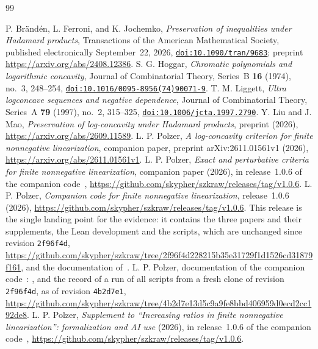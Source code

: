 \begin{thebibliography}{99}

 P. Br\"and\'en, L. Ferroni, and K. Jochemko, \emph{Preservation of inequalities under Hadamard products}, Transactions of the American Mathematical Society, published electronically September~22, 2026, \href{https://doi.org/10.1090/tran/9683}{\nolinkurl{doi:10.1090/tran/9683}}; preprint \url{https://arxiv.org/abs/2408.12386}.
 S. G. Hoggar, \emph{Chromatic polynomials and logarithmic concavity}, Journal of Combinatorial Theory, Series~B \textbf{16} (1974), no.~3, 248--254, \href{https://doi.org/10.1016/0095-8956(74)90071-9}{\nolinkurl{doi:10.1016/0095-8956(74)90071-9}}.
 T. M. Liggett, \emph{Ultra logconcave sequences and negative dependence}, Journal of Combinatorial Theory, Series~A \textbf{79} (1997), no.~2, 315--325, \href{https://doi.org/10.1006/jcta.1997.2790}{\nolinkurl{doi:10.1006/jcta.1997.2790}}.
 Y. Liu and J. Mao, \emph{Preservation of log-concavity under Hadamard products}, preprint (2026), \url{https://arxiv.org/abs/2609.11589}.
 L. P. Polzer, \emph{A log-concavity criterion for finite nonnegative linearization}, companion paper, preprint arXiv:2611.01561v1 (2026), \url{https://arxiv.org/abs/2611.01561v1}.
 L. P. Polzer, \emph{Exact and perturbative criteria for finite nonnegative linearization}, companion paper (2026), in release~1.0.6 of the companion code~\cite{code}, \url{https://github.com/skypher/szkraw/releases/tag/v1.0.6}.
 L. P. Polzer, \emph{Companion code for finite nonnegative linearization}, release~1.0.6 (2026), \url{https://github.com/skypher/szkraw/releases/tag/v1.0.6}. This release is the single landing point for the evidence: it contains the three papers and their supplements, the Lean development and the scripts, which are unchanged since revision \texttt{2f96f4d}, \url{https://github.com/skypher/szkraw/tree/2f96f4d228215b35e31729f1d1526cd31879f161}, and the documentation of~\cite{docs}.
 L. P. Polzer, documentation of the companion code~\cite{code}: ,  and the record  of a run of all scripts from a fresh clone of revision \texttt{2f96f4d}, as of revision \texttt{4b2d7e1}, \url{https://github.com/skypher/szkraw/tree/4b2d7e13d5c9a9fe8bbd406959d0ecd2cc192de8}.
 L. P. Polzer, \emph{Supplement to ``Increasing ratios in finite nonnegative linearization'': formalization and AI use} (2026), in release~1.0.6 of the companion code~\cite{code}, \url{https://github.com/skypher/szkraw/releases/tag/v1.0.6}.

\end{thebibliography}

